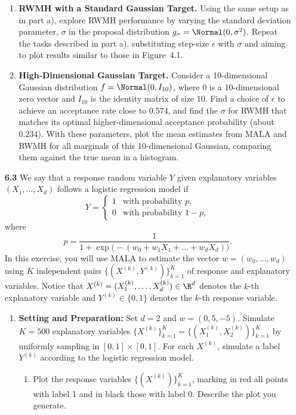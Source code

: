 \begin{enumerate}
\begin{enumerate}[label=\alph*)]
  \item \textbf{RWMH with a Standard Gaussian Target.}
    Using the same setup as in part a), explore RWMH performance by varying the standard
    deviation parameter, $\sigma$ in the proposal distribution $g_\sigma = \Normal(0, \sigma^2)$.
    Repeat the tasks described in part a), substituting step-size $\epsilon$ with $\sigma$ and
    aiming to plot results similar to those in Figure~4.1.

  \item \textbf{High-Dimensional Gaussian Target.}
    Consider a 10-dimensional Gaussian distribution $f = \Normal(0, I_{10})$, where $0$ is a
    10-dimensional zero vector and $I_{10}$ is the identity matrix of size $10$. Find a choice
    of $\epsilon$ to achieve an acceptance rate close to $0.574$, and find the $\sigma$ for
    RWMH that matches its optimal higher-dimensional acceptance probability (about $0.234$).
    With these parameters, plot the mean estimates from MALA and RWMH for all marginals of
    this 10-dimensional Gaussian, comparing them against the true mean in a histogram.
\end{enumerate}

\item[\textbf{6.3}]
We say that a response random variable $Y$ given explanatory variables $(X_1, \ldots, X_d)$
follows a logistic regression model if
\[
  Y = \begin{cases} 1 & \text{with probability } p, \\ 0 & \text{with probability } 1-p, \end{cases}
\]
where
\[
  p = \frac{1}{1 + \exp\bigl(-(w_0 + w_1 X_1 + \ldots + w_d X_d)\bigr)}.
\]
In this exercise, you will use MALA to estimate the vector $w = (w_0, \ldots, w_d)$ using $K$
independent pairs $\{(X^{(k)}, Y^{(k)})\}_{k=1}^K$ of response and explanatory variables.
Notice that $X^{(k)} = (X_1^{(k)}, \ldots, X_d^{(k)}) \in \R^d$ denotes the $k$-th
explanatory variable and $Y^{(k)} \in \{0,1\}$ denotes the $k$-th response variable.

\begin{enumerate}[label=\arabic*.]
  \item \textbf{Setting and Preparation:} Set $d = 2$ and $w = (0, 5, -5)$. Simulate $K = 500$
    explanatory variables $\{X^{(k)}\}_{k=1}^K = \{(X_1^{(k)}, X_2^{(k)})\}_{k=1}^K$ by
    uniformly sampling in $[0,1] \times [0,1]$. For each $X^{(k)}$, simulate a label $Y^{(k)}$
    according to the logistic regression model.

    \begin{enumerate}[label=\alph*)]
      \item Plot the response variables $\{(X^{(k)})\}_{k=1}^K$, marking in red all points
        with label 1 and in black those with label 0. Describe the plot you generate.
    \end{enumerate}


\end{enumerate}
\end{enumerate}
